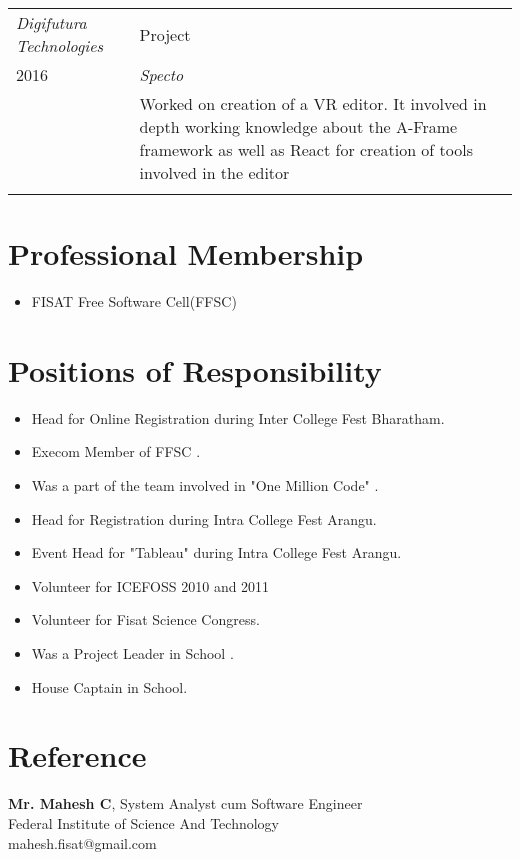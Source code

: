 \documentclass[a4paper]{article}
\begin{document}
\begin{tabular}{p{4cm}|p{13cm}}
\emph{Digifutura Technologies} & Project \\
\textsc{2016} & \emph{Specto} \\
& \normalsize{ Worked on creation of a VR editor. It involved in depth working knowledge about the A-Frame framework as well as React for creation of tools involved in the editor
}
\\
\multicolumn{2}{c}{}
\end{tabular}

\section{Professional Membership}
\begin{itemize}
\item FISAT Free Software Cell(FFSC)
\end{itemize}

\section{Positions of Responsibility}
\begin{itemize}
\item	Head for Online Registration during Inter College Fest Bharatham.
\item	Execom Member of FFSC .
\item	Was a part of the team involved in "One Million Code" .
\item	Head for Registration during Intra College Fest Arangu.
\item	Event Head for "Tableau" during Intra College Fest Arangu.
\item	Volunteer for ICEFOSS 2010 and 2011
\item	Volunteer for Fisat Science Congress.
\item	Was a Project Leader in School .
\item	House Captain in School.

\end{itemize}

\section{Reference}

\textbf{Mr. Mahesh C},  System Analyst cum Software Engineer\\
\indent  Federal Institute of  Science And Technology \\
\indent mahesh.fisat@gmail.com \\
\end{document}
